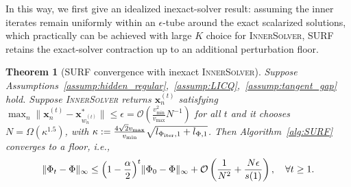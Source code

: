 \documentclass{article}
\newtheorem{theorem}{Theorem}
\newcommand{\Oc}{\mathcal{O}}
\newcommand{\bx}{\mathbf{x}}
\newcommand{\Farc}{\Phi}
\begin{document}
In this way, we first give an idealized inexact-solver result: assuming the inner iterates remain uniformly within an $\epsilon$-tube around the exact scalarized solutions, which practically can be achieved with large $K$ choice for \textsc{InnerSolver}, SURF retains the exact-solver contraction up to an additional perturbation floor.
\begin{theorem}[SURF convergence with inexact \textsc{InnerSolver}]
    Suppose Assumptions~\ref{assump:hidden_regular},~\ref{assump:LICQ},~\ref{assump:tangent_gap} hold.
    Suppose \textsc{InnerSolver} returns $\bx_n^{(t)}$ satisfying $\max_n\|\bx_n^{(t)}-\bx_{w_n^{(t)}}^*\|\leq \epsilon= \Oc\left(\frac{v_{\min}^2}{v_{\max}}N^{-1}\right)$ for all $t$
    and it chooses $N = \Omega(\kappa^{1.5})$, with $\kappa := \frac{4 \sqrt{2}v_{\max}}{v_{\min}}\sqrt{l_{\Farc_{\rm iter},1}+l_{\Farc,1}}$.
    Then Algorithm~\ref{alg:SURF} converges to a floor, i.e., 
    \begin{align}
    \|\Farc_t-\Farc\|_\infty
    \le
    \Bigl(1-\frac{\alpha}{2}\Bigr)^t\|\Farc_0-\Farc\|_\infty + \Oc\left(\frac{1}{N^2} + \frac{N\epsilon }{s(1)}\right),\quad \forall t \geq 1.
    \label{eq:inexact_convergence_epsilon}
    \end{align}
\end{theorem}
\end{document}
